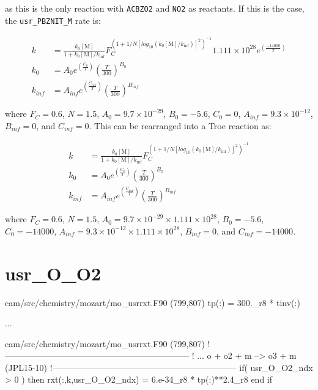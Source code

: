 \documentclass[titlepage]{article}
\begin{document}
\noindent as this is the only reaction with \verb>ACBZO2> and \verb>NO2> as reactants. If this is the case, the \verb>usr_PBZNIT_M> rate is:

\begin{equation}
\begin{split}
k & = \frac{k_0[\mbox{M}]}{1+k_0[\mbox{M}]/k_{\inf}}F_C^{(1+1/N[log_{10}(k_0[\mbox{M}]/k_{\inf})]^2)^{-1}} 1.111 \times 10^{28} e^{\left(\frac{-14000}{T}\right)}\\
k_0 & = A_0 e^{\left( \frac{C_0}{T} \right)} \left( \frac{T}{300} \right)^{B_0} \\
k_{inf} & = A_{inf} e^{\left( \frac{C_{inf}}{T} \right)} \left( \frac{T}{300} \right)^{B_{inf}}
\end{split}
\end{equation}

\noindent where $F_C = 0.6$, $N = 1.5$, $A_0 = 9.7 \times 10^{-29}$, $B_0 = -5.6$, $C_0 = 0$, $A_{inf} = 9.3 \times 10^{-12}$, $B_{inf} = 0$, and $C_{inf} = 0$. This can be rearranged into a Troe reaction as:

\begin{equation}
\begin{split}
k & = \frac{k_0[\mbox{M}]}{1+k_0[\mbox{M}]/k_{\inf}}F_C^{(1+1/N[log_{10}(k_0[\mbox{M}]/k_{\inf})]^2)^{-1}} \\
k_0 & = A_0 e^{\left( \frac{C_0}{T} \right)} \left( \frac{T}{300} \right)^{B_0} \\
k_{inf} & = A_{inf} e^{\left( \frac{C_{inf}}{T} \right)} \left( \frac{T}{300} \right)^{B_{inf}}
\end{split}
\end{equation}

\noindent where $F_C = 0.6$, $N = 1.5$, $A_0 = 9.7 \times 10^{-29} \times 1.111 \times 10^{28}$, $B_0 = -5.6$, $C_0 = -14000$, $A_{inf} = 9.3 \times 10^{-12} \times 1.111 \times 10^{28}$, $B_{inf} = 0$, and $C_{inf} = -14000$.


\section{usr\_O\_O2}

\begin{blockcode}[commandchars=\\\{\}]
\color{gray}cam/src/chemistry/mozart/mo_usrrxt.F90 (799,807)
       tp(:)             = 300._r8 * tinv(:)

\color{gray}...

\color{gray}cam/src/chemistry/mozart/mo_usrrxt.F90 (799,807)
!-----------------------------------------------------------------
! ... o + o2 + m --> o3 + m (JPL15-10)
!-----------------------------------------------------------------
       if( usr_O_O2_ndx > 0 ) then
          rxt(:,k,usr_O_O2_ndx) = 6.e-34_r8 * tp(:)**2.4_r8
       end if
\end{blockcode}
\end{document}
